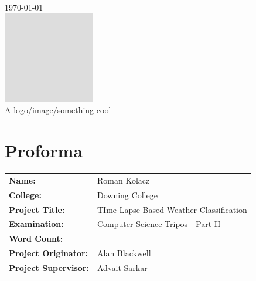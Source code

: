 \documentclass[a4paper,12pt,twoside]{report}
\begin{document}
\begin{titlepage}


{\large \today}\\[3cm] %


\includegraphics[height=4cm]{pixel.png}\\
A logo/image/something cool
 

\vfill %

\end{titlepage}

\chapter*{Proforma}

\begin{tabular}{ll}
  \bf Name: & Roman Kolacz \\
  \bf College: & Downing College \\
  \bf Project Title: & TIme-Lapse Based Weather Classification \\
  \bf Examination: & Computer Science Tripos - Part II \\
  \bf Word Count: \\
  \bf Project Originator: & Alan Blackwell \\
  \bf Project Supervisor: & Advait Sarkar \\
\end{tabular}
\end{document}
